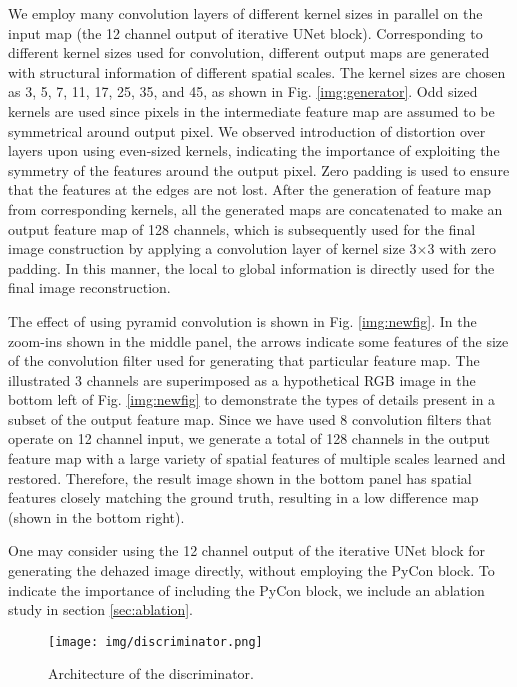 \documentclass[runningheads]{llncs}
\begin{document}
We employ many convolution layers of different kernel sizes in parallel on the input map (the 12 channel output of iterative UNet block). Corresponding to different kernel sizes used for convolution, different output maps are generated with structural information of different spatial scales. The kernel sizes are chosen as 3, 5, 7, 11, 17, 25, 35, and 45, as shown in Fig. \ref{img:generator}. Odd sized kernels are used since pixels in the intermediate feature map are assumed to be symmetrical around output pixel. We observed introduction of distortion over layers upon using even-sized kernels, indicating the importance of exploiting the symmetry of the features around the output pixel. Zero padding is used to ensure that the features at the edges are not lost. After the generation of feature map from corresponding kernels, all the generated maps are concatenated to make an output feature map of 128 channels, which is subsequently used for the final image construction by applying a convolution layer of kernel size 3$\times$3 with zero padding.  In this manner, the local to global information is directly used for the final image reconstruction.

The effect of using pyramid convolution is shown in Fig. \ref{img:newfig}. In the zoom-ins shown in the middle panel, the arrows indicate some features of the size of the convolution filter used for generating that particular feature map. The illustrated 3 channels are superimposed as a hypothetical RGB image in the bottom left of Fig. \ref{img:newfig} to demonstrate the types of details present in a subset of the output feature map. Since we have used 8 convolution filters that operate on 12 channel input, we generate a total of 128 channels in the output feature map with a large variety of spatial features of multiple scales learned and restored. Therefore, the result image shown in the bottom panel has spatial features closely matching the ground truth, resulting in a low difference map (shown in the bottom right). 

One may consider using the 12 channel output of the iterative UNet block for generating the dehazed image directly, without employing the PyCon block. To indicate the importance of including the PyCon block, we include an ablation study in section \ref{sec:ablation}. 

\begin{figure}[t]
    \centering
    \texttt{[image: img/discriminator.png]}
    \caption{Architecture of the discriminator.}
    \label{fig:discriminator}
\end{figure}
\end{document}
